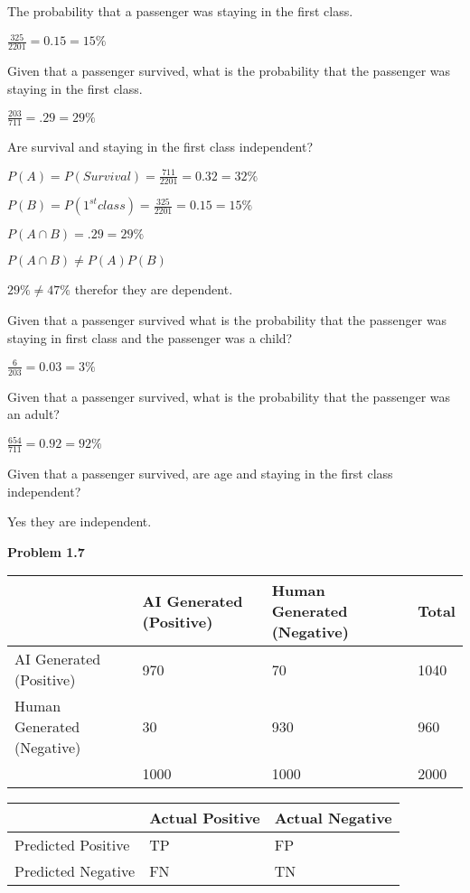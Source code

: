 \documentclass[12pt, letterpaper]{article}
\begin{document}
The probability that a passenger was staying in the first class.

$\frac{325}{2201} = 0.15 = 15\%$

Given that a passenger survived, what is the probability that the passenger was staying in the first class.

$\frac{203}{711} = .29 = 29\%$

Are survival and staying in the first class independent?

$P(A) = P(Survival) = \frac{711}{2201} = 0.32 = 32\%$

$P(B) = P(1^{st} class) = \frac{325}{2201} = 0.15 = 15\%$

$P(A \cap B) = .29 = 29\%$

$P(A \cap B) \neq P(A) P(B)$

$29\% \neq 47\%$ therefor they are dependent.

Given that a passenger survived what is the probability that the passenger was staying in first class and the passenger was a child?

$\frac{6}{203} = 0.03 = 3\%$

Given that a passenger survived, what is the probability that the passenger was an adult?

$\frac{654}{711} = 0.92 = 92\%$

Given that a passenger survived, are age and staying in the first class independent?

Yes they are independent.

\textbf{Problem 1.7}

\begin{center}
\begin{tabular}{ | m{13em} | m{3cm}| m{3cm} | m{2cm} | } 
    \hline
    & AI Generated (Positive) & Human Generated (Negative) & Total \\
    \hline
    AI Generated (Positive) & 970 & 70 & 1040 \\
    \hline
    Human Generated (Negative) & 30 & 930 & 960 \\
    \hline
    & 1000 & 1000 & 2000 \\
    \hline
\end{tabular}
\end{center}

\begin{center}
\begin{tabular}{ | m{10em} | m{3cm} | m{3cm} | } 
    \hline
    & Actual Positive & Actual Negative \\
    \hline
    Predicted Positive & TP & FP \\
    \hline
    Predicted Negative & FN & TN \\
    \hline
\end{tabular}
\end{center}
\end{document}
